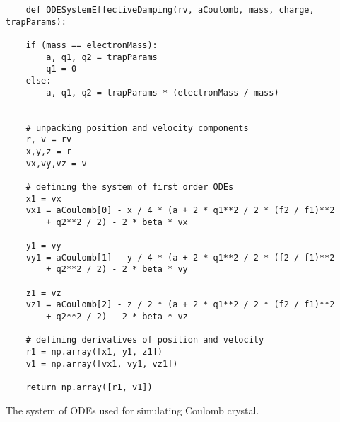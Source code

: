 \begin{listing}[H]
\begin{lstlisting}
	def ODESystemEffectiveDamping(rv, aCoulomb, mass, charge, trapParams):

    if (mass == electronMass):        
        a, q1, q2 = trapParams
        q1 = 0
    else:
        a, q1, q2 = trapParams * (electronMass / mass)
    
	    
    # unpacking position and velocity components
    r, v = rv
    x,y,z = r
    vx,vy,vz = v
    
    # defining the system of first order ODEs
    x1 = vx
    vx1 = aCoulomb[0] - x / 4 * (a + 2 * q1**2 / 2 * (f2 / f1)**2 
    	+ q2**2 / 2) - 2 * beta * vx
    
    y1 = vy
    vy1 = aCoulomb[1] - y / 4 * (a + 2 * q1**2 / 2 * (f2 / f1)**2 
    	+ q2**2 / 2) - 2 * beta * vy
    
    z1 = vz
    vz1 = aCoulomb[2] - z / 2 * (a + 2 * q1**2 / 2 * (f2 / f1)**2 
    	+ q2**2 / 2) - 2 * beta * vz
    
	# defining derivatives of position and velocity 
    r1 = np.array([x1, y1, z1])
    v1 = np.array([vx1, vy1, vz1])

    return np.array([r1, v1])	    
\end{lstlisting}
\caption{The system of ODEs used for simulating Coulomb crystal.}
\label{lst:crystal}
\end{listing} 